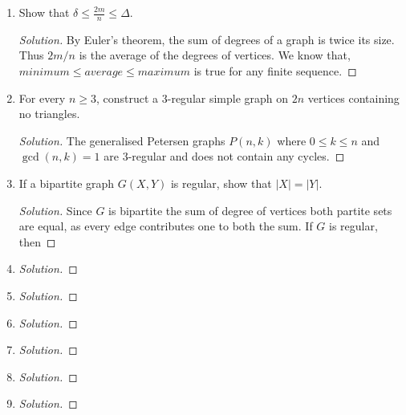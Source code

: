 \begin{enumerate}
\begin{proof}[Solution]
		Suppose order of $G$ is even, $n = 2k$. Then the size of the bipartite graph is maximum when $p = q = k$. And size 
		$$ m \le  pq = k^2 = \frac{n^2}{4} $$
		Suppose order of $G$ is odd, $n = 2k+1$. The the size of the bipartite graph is maximum when $p = k$ and $q = k+1$. And size 
		$$ m \le pq = k(k+1) \le \left(k+\frac{1}{2}\right)^2 = \frac{n^2}{4} $$
	\end{proof}
	\item Show that $\delta \le \frac{2m}{n} \le \Delta$.
	\begin{proof}[Solution]
		By Euler's theorem, the sum of degrees of a graph is twice its size. Thus $2m/n$ is the average of the degrees of vertices. We know that, $minimum \le average \le maximum$ is true for any finite sequence.
	\end{proof}
	\item For every $n \ge 3$, construct a $3$-regular simple graph on $2n$ vertices containing no triangles.
	\begin{proof}[Solution]
		The generalised Petersen graphs $P(n,k)$ where $0 \le k \le n$ and $\gcd(n,k)=1$ are $3$-regular and does not contain any cycles.
	\end{proof}
\item If a bipartite graph $G(X,Y)$ is regular, show that $|X| = |Y|$.
	\begin{proof}[Solution]
		Since $G$ is bipartite the sum of degree of vertices both partite sets are equal, as every edge contributes one to both the sum. If $G$ is regular, then 
	\end{proof}
	\item
	\begin{proof}[Solution]
	\end{proof}
	\item
	\begin{proof}[Solution]
	\end{proof}
	\item
	\begin{proof}[Solution]
	\end{proof}
	\item
	\begin{proof}[Solution]
	\end{proof}
	\item
	\begin{proof}[Solution]
	\end{proof}
	\item
	\begin{proof}[Solution]
	\end{proof}

\end{enumerate}
